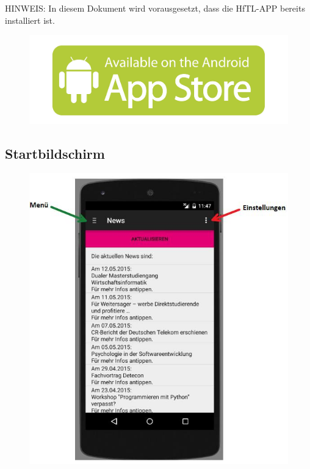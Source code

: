 HINWEIS: In diesem Dokument wird vorausgesetzt, dass die HfTL-APP bereits installiert ist.
\begin{figure}[h]
	\centering
	\includegraphics[scale=0.5]{03_Bedienungsanleitung/img/appstore.jpg}
	\label{img:grafik-dummy}
\end{figure}

\newpage

\subsection{Startbildschirm}


\begin{figure}[h]
	\centering
	\includegraphics[scale=0.8]{03_Bedienungsanleitung/img/start2.jpg}
	\label{img:grafik-dummy}
\end{figure}

